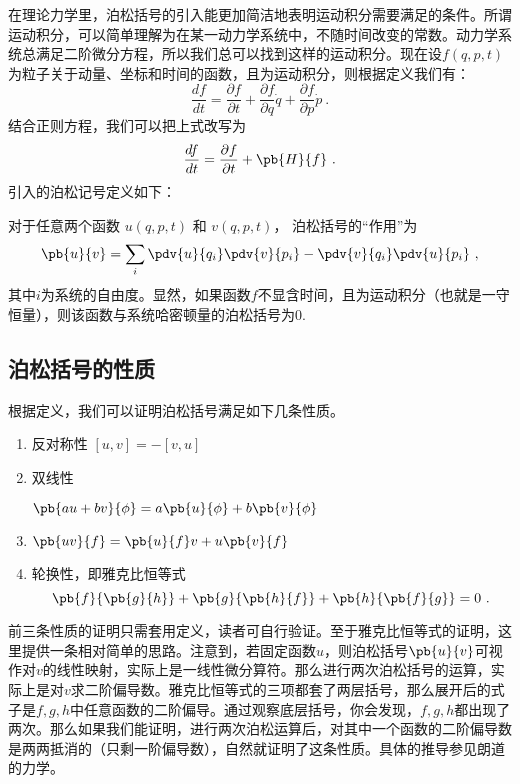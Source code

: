 
\begin{issues}
\issueDraft
\end{issues}

在理论力学里，泊松括号的引入能更加简洁地表明运动积分需要满足的条件。所谓运动积分，可以简单理解为在某一动力学系统中，不随时间改变的常数。动力学系统总满足二阶微分方程，所以我们总可以找到这样的运动积分。现在设$f(q,p,t)$为粒子关于动量、坐标和时间的函数，且为运动积分，则根据定义我们有：
\begin{equation}
\frac{df}{dt}=\frac{\partial f}{\partial t}+\frac{\partial f}{\partial q}\dot{q}+\frac{\partial f}{\partial p}\dot{ p}~.
\end{equation}
结合正则方程，我们可以把上式改写为
\begin{equation}\label{eq_poison_10}
\frac{df}{dt}=\frac{\partial f}{\partial t}+\pb{H}{f}~.
\end{equation}
引入的泊松记号定义如下：


对于任意两个函数 $u(q, p, t)$ 和 $v(q, p, t)$， 泊松括号的“作用”为
\begin{equation}
\pb{u}{v} = \sum_i \pdv{u}{q_i}\pdv{v}{p_i} - \pdv{v}{q_i}\pdv{u}{p_i}~,
\end{equation}
其中$i$为系统的自由度。显然，如果函数$f$不显含时间，且为运动积分（也就是一守恒量），则该函数与系统哈密顿量的泊松括号为0.

\subsection{泊松括号的性质}
根据定义，我们可以证明泊松括号满足如下几条性质。
\begin{enumerate}
\item 反对称性
$[u,v]=-[v,u]$
\item 双线性

$\pb{au+bv}{\phi}=a\pb{u}{\phi}+b\pb{v}{\phi}$
\item 
$\pb{uv}{f}=\pb{u}{f}v+u\pb{v}{f}$

\item 轮换性，即雅克比恒等式
\begin{equation}
\pb{f}{\pb{g}{h}}+\pb{g}{\pb{h}{f}}+\pb{h}{\pb{f}{g}}=0~.
\end{equation}
\end{enumerate}
前三条性质的证明只需套用定义，读者可自行验证。至于雅克比恒等式的证明，这里提供一条相对简单的思路。注意到，若固定函数$u$，则泊松括号$\pb{u}{v}$可视作对$v$的线性映射，实际上是一线性微分算符。那么进行两次泊松括号的运算，实际上是对$v$求二阶偏导数。雅克比恒等式的三项都套了两层括号，那么展开后的式子是$f,g,h$中任意函数的二阶偏导。通过观察底层括号，你会发现，$f,g,h$都出现了两次。那么如果我们能证明，进行两次泊松运算后，对其中一个函数的二阶偏导数是两两抵消的（只剩一阶偏导数），自然就证明了这条性质。具体的推导参见朗道的力学。

